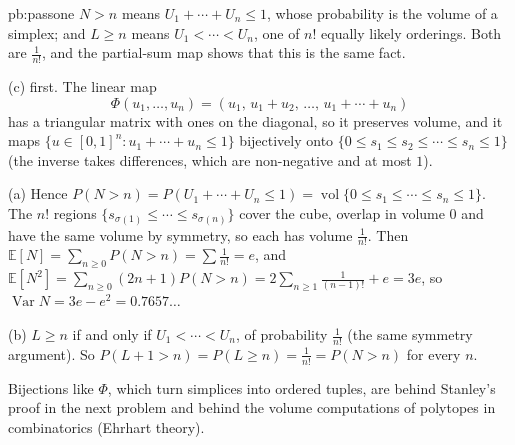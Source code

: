 \begin{solution}{pb:passone}
\idea $N>n$ means $U_1+\cdots+U_n\le1$, whose probability is the volume of a simplex; and $L\ge n$ means $U_1<\cdots<U_n$, one of $n!$ equally
likely orderings. Both are $\frac1{n!}$, and the partial-sum map shows that this is the same fact.

\writeup (c) first. The linear map
\[
\Phi(u_1,\dots,u_n)=(u_1,\,u_1+u_2,\,\dots,\,u_1+\cdots+u_n)
\]
has a triangular matrix with ones on the diagonal, so it
preserves volume, and it maps $\{u\in[0,1]^n:u_1+\cdots+u_n\le1\}$ bijectively onto $\{0\le s_1\le s_2\le\cdots\le s_n\le1\}$ (the inverse takes
differences, which are non-negative and at most $1$).

(a) Hence $P(N>n)=P(U_1+\cdots+U_n\le1)=\operatorname{vol}\{0\le s_1\le\cdots\le s_n\le1\}$. The $n!$ regions $\{s_{\sigma(1)}\le\cdots\le s_{\sigma(n)}\}$ cover the cube,
overlap in volume $0$ and have the same volume by symmetry, so each has volume $\frac1{n!}$. Then $\mathbb E[N]=\sum_{n\ge0}P(N>n)=\sum\frac1{n!}=e$, and
$\mathbb E[N^2]=\sum_{n\ge0}(2n+1)P(N>n)=2\sum_{n\ge1}\frac1{(n-1)!}+e=3e$, so $\operatorname{Var}N=3e-e^2=0.7657\ldots$

(b) $L\ge n$ if and only if $U_1<\cdots<U_n$, of probability $\frac1{n!}$ (the same symmetry argument). So $P(L+1>n)=P(L\ge n)=\frac1{n!}=P(N>n)$ for
every $n$.

\leads Bijections like $\Phi$, which turn simplices into ordered tuples, are behind Stanley's proof in the next problem and behind the
volume computations of polytopes in combinatorics (Ehrhart theory).
\end{solution}

